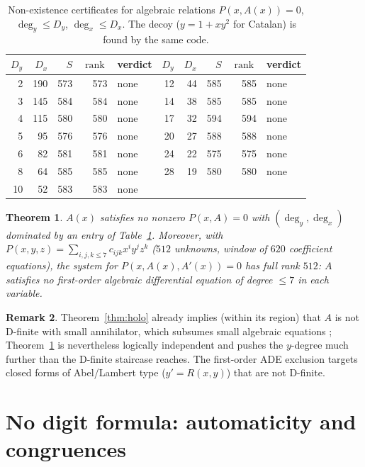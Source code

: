 \documentclass[11pt]{article}
\newtheorem{theorem}{Theorem}[section]
\theoremstyle{definition}
\newtheorem{remark}[theorem]{Remark}
\DeclareMathOperator{\rank}{rank}
\begin{document}
\begin{table}[ht]
\centering\small
\begin{tabular}{rrrrl@{\qquad\qquad}rrrrl}
\toprule
$D_y$ & $D_x$ & $S$ & $\rank$ & verdict & $D_y$ & $D_x$ & $S$ & $\rank$ & verdict\\
\midrule
 2 & 190 & 573 & 573 & none & 12 & 44 & 585 & 585 & none\\
 3 & 145 & 584 & 584 & none & 14 & 38 & 585 & 585 & none\\
 4 & 115 & 580 & 580 & none & 17 & 32 & 594 & 594 & none\\
 5 &  95 & 576 & 576 & none & 20 & 27 & 588 & 588 & none\\
 6 &  82 & 581 & 581 & none & 24 & 22 & 575 & 575 & none\\
 8 &  64 & 585 & 585 & none & 28 & 19 & 580 & 580 & none\\
10 &  52 & 583 & 583 & none &    &    &     &     &     \\
\bottomrule
\end{tabular}
\caption{Non-existence certificates for algebraic relations $P(x,A(x))=0$,
$\deg_y\le D_y$, $\deg_x\le D_x$. The decoy ($y=1+xy^2$ for Catalan) is found by
the same code.}\label{tab:alg}
\end{table}

\begin{theorem}\label{thm:alg}
$A(x)$ satisfies no nonzero $P(x,A)=0$ with $(\deg_y,\deg_x)$ dominated by an
entry of Table~\ref{tab:alg}. Moreover, with
$P(x,y,z)=\sum_{i,j,k\le 7}c_{ijk}x^iy^jz^k$ ($512$ unknowns, window of $620$
coefficient equations), the system for $P(x,A(x),A'(x))=0$ has full rank $512$:
$A$ satisfies no first-order algebraic differential equation of degree $\le7$ in
each variable.
\end{theorem}

\begin{remark}
Theorem~\ref{thm:holo} already implies (within its region) that $A$ is not
D-finite with small annihilator, which subsumes small algebraic equations
\cite{Comtet1964}; Theorem~\ref{thm:alg} is nevertheless logically independent
and pushes the $y$-degree much further than the D-finite staircase reaches.
The first-order ADE exclusion targets closed forms of Abel/Lambert type
($y'=R(x,y)$) that are not D-finite.
\end{remark}

\section{No digit formula: automaticity and congruences}\label{sec:autom}
\end{document}
